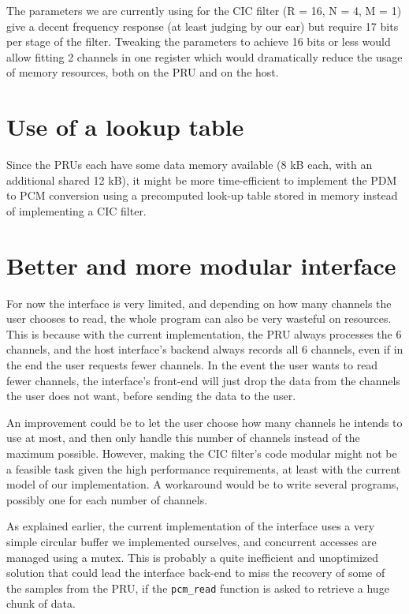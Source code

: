 \documentclass[]{report}
\begin{document}
The parameters we are currently using for the CIC filter (R = 16, N = 4, M = 1) give a decent frequency response (at least judging by our ear) but require 17 bits per stage of the filter. Tweaking the parameters to achieve 16 bits or less would allow fitting 2 channels in one register which would dramatically reduce the usage of memory resources, both on the PRU and on the host.


\hypertarget{use-of-a-lookup-table}{%
\section{Use of a lookup table}\label{use-of-a-lookup-table}}

Since the PRUs each have some data memory available (8 kB each, with an additional shared 12 kB), it might be more time-efficient to implement the PDM to PCM conversion using a precomputed look-up table stored in memory instead of implementing a CIC filter.

\hypertarget{better-and-more-modular-interface}{%
\section{Better and more modular
interface}\label{better-and-more-modular-interface}}

For now the interface is very limited, and depending on how many channels the user chooses to read, the whole program can also be very wasteful on resources. This is because with the current implementation, the PRU always processes the 6 channels, and the host interface's backend always records all 6 channels, even if in the end the user requests fewer channels. In the event the user wants to read fewer channels, the interface's front-end will just drop the data from the channels the user does not want, before sending the data to the user.

An improvement could be to let the user choose how many channels he intends to use at most, and then only handle this number of channels instead of the maximum possible. However, making the CIC filter's code modular might not be a feasible task given the high performance requirements, at least with the current model of our implementation. A workaround would be to write several programs, possibly one for each number of channels.

As explained earlier, the current implementation of the interface uses a very simple circular buffer we implemented ourselves, and concurrent accesses are managed using a mutex. This is probably a quite inefficient and unoptimized solution that could lead the interface back-end to miss the recovery of some of the samples from the PRU, if the \texttt{pcm\_read} function is asked to retrieve a huge chunk of data.
\end{document}
